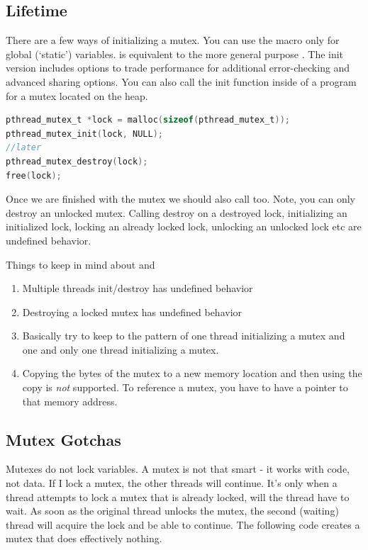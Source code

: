 \subsection{Lifetime}

There are a few ways of initializing a mutex. You can use the macro  only for global (`static') variables.  is equivalent to the more general purpose . The init version includes options to trade performance for additional error-checking and advanced sharing options. You can also call the init function inside of a program for a mutex located on the heap.

\begin{lstlisting}[language=C]
pthread_mutex_t *lock = malloc(sizeof(pthread_mutex_t)); 
pthread_mutex_init(lock, NULL);
//later
pthread_mutex_destroy(lock);
free(lock);
\end{lstlisting}

Once we are finished with the mutex we should also call  too. Note, you can only destroy an unlocked mutex. Calling destroy on a destroyed lock, initializing an initialized lock, locking an already locked lock, unlocking an unlocked lock etc are undefined behavior.

Things to keep in mind about  and 
\begin{enumerate} 
\item Multiple threads init/destroy has undefined behavior  
\item Destroying a locked mutex has undefined behavior  
\item Basically try to keep to the pattern of one thread initializing a mutex and one and only one thread initializing a mutex.
\item Copying the bytes of the mutex to a new memory location and then using the copy is \emph{not} supported. To reference a mutex, you have to have a pointer to that memory address.
\end{enumerate}

\subsection{Mutex Gotchas}

Mutexes do not lock variables. A mutex is not that smart - it works with code, not data. If I lock a mutex, the other threads will continue. It's only when a thread attempts to lock a mutex that is already locked, will the thread have to wait. As soon as the original thread unlocks the mutex, the second (waiting) thread will acquire the lock and be able to continue. The following code creates a mutex that does effectively nothing.

